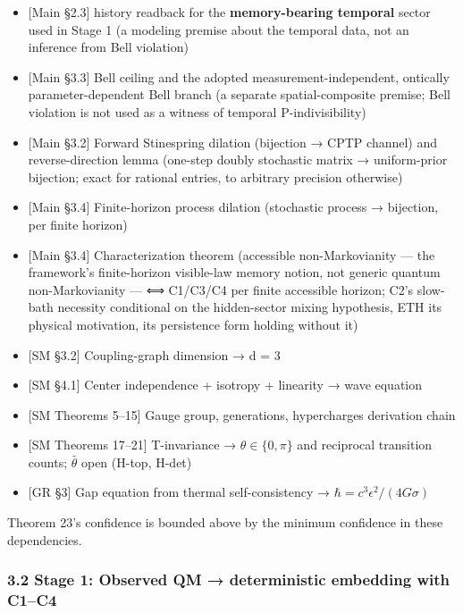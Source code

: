 \documentclass[
]{article}
\providecommand{\tightlist}{%
  \setlength{\itemsep}{0pt}\setlength{\parskip}{0pt}}
\begin{document}
\begin{itemize}
\tightlist
\item
  {[}Main §2.3{]} history readback for the \textbf{memory-bearing
  temporal} sector used in Stage 1 (a modeling premise about the
  temporal data, not an inference from Bell violation)
\item
  {[}Main §3.3{]} Bell ceiling and the adopted measurement-independent,
  ontically parameter-dependent Bell branch (a separate
  spatial-composite premise; Bell violation is not used as a witness of
  temporal P-indivisibility)
\item
  {[}Main §3.2{]} Forward Stinespring dilation (bijection → CPTP
  channel) and reverse-direction lemma (one-step doubly stochastic
  matrix → uniform-prior bijection; exact for rational entries, to
  arbitrary precision otherwise)
\item
  {[}Main §3.4{]} Finite-horizon process dilation (stochastic process →
  bijection, per finite horizon)
\item
  {[}Main §3.4{]} Characterization theorem (accessible non-Markovianity
  --- the framework's finite-horizon visible-law memory notion, not
  generic quantum non-Markovianity --- ⟺ C1/C3/C4 per finite accessible
  horizon; C2's slow-bath necessity conditional on the hidden-sector
  mixing hypothesis, ETH its physical motivation, its persistence form
  holding without it)
\item
  {[}SM §3.2{]} Coupling-graph dimension → d = 3
\item
  {[}SM §4.1{]} Center independence + isotropy + linearity → wave
  equation
\item
  {[}SM Theorems 5--15{]} Gauge group, generations, hypercharges
  derivation chain
\item
  {[}SM Theorems 17--21{]} T-invariance → \(\theta\in\{0,\pi\}\) and
  reciprocal transition counts; \(\bar\theta\) open (H-top, H-det)
\item
  {[}GR §3{]} Gap equation from thermal self-consistency →
  \(\hbar = c^3 \epsilon^2 / (4G\sigma)\)
\end{itemize}

Theorem 23's confidence is bounded above by the minimum confidence in
these dependencies.

\hypertarget{stage-1-observed-qm-deterministic-embedding-with-c1c4}{%
\subsubsection{3.2 Stage 1: Observed QM → deterministic embedding with
C1--C4}\label{stage-1-observed-qm-deterministic-embedding-with-c1c4}}
\end{document}
